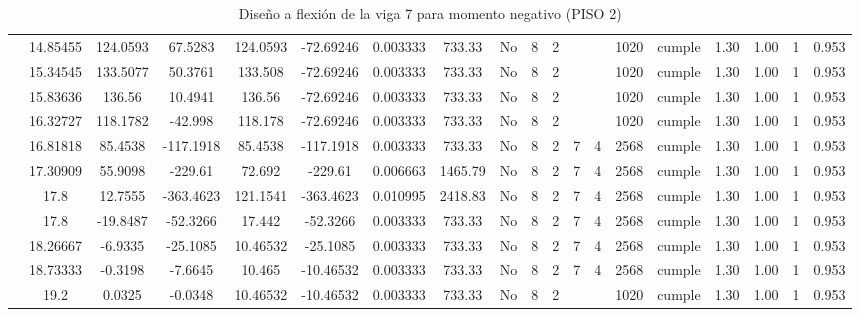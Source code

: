 \begin{table}[H]
{\begin{tabular}{|c|c|c|c|c|c|r|c|c|c|c|c|c|c|c|c|c|c|c|}
\cline{2-19}        & 14.85455 & 124.0593 & 67.5283 & 124.0593 & -72.69246 & 0.003333 & 733.33 & No  & 8   & 2   &     &     & 1020 & \cellcolor[rgb]{ .776,  .937,  .808}cumple & 1.30 & 1.00 & 1   & 0.953 \bigstrut\\
\cline{2-19}        & 15.34545 & 133.5077 & 50.3761 & 133.508 & -72.69246 & 0.003333 & 733.33 & No  & 8   & 2   &     &     & 1020 & \cellcolor[rgb]{ .776,  .937,  .808}cumple & 1.30 & 1.00 & 1   & 0.953 \bigstrut\\
\cline{2-19}        & 15.83636 & 136.56 & 10.4941 & 136.56 & -72.69246 & 0.003333 & 733.33 & No  & 8   & 2   &     &     & 1020 & \cellcolor[rgb]{ .776,  .937,  .808}cumple & 1.30 & 1.00 & 1   & 0.953 \bigstrut\\
\cline{2-19}        & 16.32727 & 118.1782 & -42.998 & 118.178 & -72.69246 & 0.003333 & 733.33 & No  & 8   & 2   &     &     & 1020 & \cellcolor[rgb]{ .776,  .937,  .808}cumple & 1.30 & 1.00 & 1   & 0.953 \bigstrut\\
\cline{2-19}        & 16.81818 & 85.4538 & -117.1918 & 85.4538 & -117.1918 & 0.003333 & 733.33 & No  & 8   & 2   & 7   & 4   & 2568 & \cellcolor[rgb]{ .776,  .937,  .808}cumple & 1.30 & 1.00 & 1   & 0.953 \bigstrut\\
\cline{2-19}        & 17.30909 & 55.9098 & -229.61 & 72.692 & -229.61 & 0.006663 & 1465.79 & No  & 8   & 2   & 7   & 4   & 2568 & \cellcolor[rgb]{ .776,  .937,  .808}cumple & 1.30 & 1.00 & 1   & 0.953 \bigstrut\\
\cline{2-19}        & \cellcolor[rgb]{ .851,  .882,  .949}17.8 & 12.7555 & -363.4623 & 121.1541 & -363.4623 & 0.010995 & 2418.83 & No  & 8   & 2   & 7   & 4   & 2568 & \cellcolor[rgb]{ .776,  .937,  .808}cumple & 1.30 & 1.00 & 1   & 0.953 \bigstrut\\
\cline{2-19}        & \cellcolor[rgb]{ .851,  .882,  .949}17.8 & -19.8487 & -52.3266 & 17.442 & -52.3266 & 0.003333 & 733.33 & No  & 8   & 2   & 7   & 4   & 2568 & \cellcolor[rgb]{ .776,  .937,  .808}cumple & 1.30 & 1.00 & 1   & 0.953 \bigstrut\\
\cline{2-19}        & 18.26667 & -6.9335 & -25.1085 & 10.46532 & -25.1085 & 0.003333 & 733.33 & No  & 8   & 2   & 7   & 4   & 2568 & \cellcolor[rgb]{ .776,  .937,  .808}cumple & 1.30 & 1.00 & 1   & 0.953 \bigstrut\\
\cline{2-19}        & 18.73333 & -0.3198 & -7.6645 & 10.465 & -10.46532 & 0.003333 & 733.33 & No  & 8   & 2   & 7   & 4   & 2568 & \cellcolor[rgb]{ .776,  .937,  .808}cumple & 1.30 & 1.00 & 1   & 0.953 \bigstrut\\
\cline{2-19}        & 19.2 & 0.0325 & -0.0348 & 10.46532 & -10.46532 & 0.003333 & 733.33 & No  & 8   & 2   &     &     & 1020 & \cellcolor[rgb]{ .776,  .937,  .808}cumple & 1.30 & 1.00 & 1   & 0.953 \bigstrut\\
    \hline
    \end{tabular}%
  
    
  }
      \caption{Diseño a flexión de la viga 7 para momento negativo (PISO 2) }
  \label{tab:F VG7 P2 M-}%
\end{table}%
